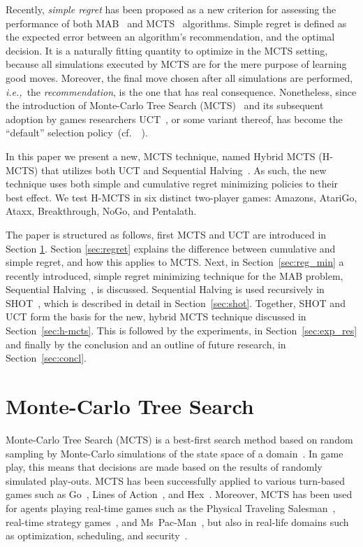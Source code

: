 \documentclass[a4paper]{llncs}
\newcommand{\ie}{{\it i.e.,}~}
\newcommand{\cf}{{cf.}~}
\begin{document}
Recently, \emph{simple regret} has been proposed as a new criterion for assessing the performance of both MAB~\cite{audibert2010best,Bubeck11Pure} and MCTS~\cite{Cazenave14SHOT,Feldman12BRUE,tolpin2012mcts} algorithms. Simple regret is defined as the expected error between an algorithm's recommendation, and the optimal decision. It is a naturally fitting quantity to optimize in the MCTS setting, because all simulations executed by MCTS are for the mere purpose of learning good moves. Moreover, the final move chosen after all simulations are performed, \ie the \emph{recommendation}, is the one that has real consequence. Nonetheless, since the introduction of Monte-Carlo Tree Search (MCTS)~\cite{kocsis2006bandit} and its subsequent adoption by games researchers UCT~\cite{kocsis2006bandit}, or some variant thereof, has become the ``default'' selection policy~(\cf~\cite{browne2012survey}). 

\vspace{1mm}
In this paper we present a new, MCTS technique, named Hybrid MCTS (H-MCTS) that utilizes both UCT and Sequential Halving~\cite{Karnin13SH}. As such, the new technique uses both simple and cumulative regret minimizing policies to their best effect. We test H-MCTS in six distinct two-player games: Amazons, AtariGo, Ataxx, Breakthrough, NoGo, and Pentalath.

The paper is structured as follows, first MCTS and UCT are introduced in Section \ref{sec:mcts}. Section \ref{sec:regret} explains the difference between cumulative and simple regret, and how this applies to MCTS. Next, in Section~\ref{sec:reg_min} a recently introduced, simple regret minimizing technique for the MAB problem, Sequential Halving~\cite{Karnin13SH}, is discussed. Sequential Halving is used recursively in SHOT~\cite{Cazenave14SHOT}, which is described in detail in Section~\ref{sec:shot}. Together, SHOT and UCT form the basis for the new, hybrid MCTS technique discussed in Section~\ref{sec:h-mcts}. This is followed by the experiments, in Section~\ref{sec:exp_res} and finally by the conclusion and an outline of future research, in Section~\ref{sec:concl}.

\section{Monte-Carlo Tree Search}
\label{sec:mcts}

Monte-Carlo Tree Search (MCTS) is a best-first search method based on random sampling by Monte-Carlo simulations of the state space of a domain~\cite{coulom2007efficient,kocsis2006bandit}. In game play, this means that decisions are made based on the results of randomly simulated play-outs. MCTS has been successfully applied to various turn-based games such as Go~\cite{lee2010current}, Lines of Action~\cite{Winands2010b}, and Hex~\cite{arneson2010monte}. Moreover, MCTS has been used for agents playing real-time games such as the Physical Traveling Salesman~\cite{powleytsp}, real-time strategy games~\cite{balla2009uct}, and Ms~Pac-Man~\cite{realtime2014}, but also in real-life domains such as optimization, scheduling, and security~\cite{browne2012survey}.
\end{document}
